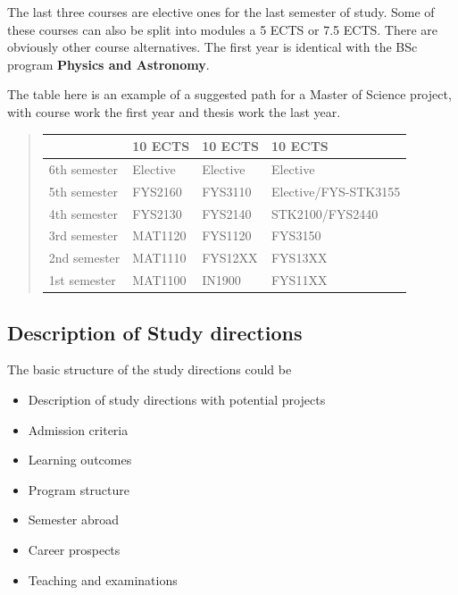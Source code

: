 \documentclass[%
oneside,                 %
final,                   %
10pt]{article}
\begin{document}
\noindent
The last three courses are elective ones for the last semester of
study. Some of these courses can also be split into modules a 5 ECTS
or 7.5 ECTS.  There are obviously other course alternatives.  The
first year is identical with the BSc program \textbf{Physics and Astronomy}.

The table here is an example of a suggested path for a Master of Science project,
with course work the first year and thesis work the last year.


\begin{quote}
\begin{tabular}{llll}
\hline
\multicolumn{1}{l}{  } & \multicolumn{1}{l}{ 10 ECTS } & \multicolumn{1}{l}{ 10 ECTS } & \multicolumn{1}{l}{ 10 ECTS } \\
\hline
6th semester & Elective & Elective & Elective             \\
\hline
5th semester & FYS2160  & FYS3110  & Elective/FYS-STK3155 \\
\hline
4th semester & FYS2130  & FYS2140  & STK2100/FYS2440      \\
\hline
3rd semester & MAT1120  & FYS1120  & FYS3150              \\
\hline
2nd semester & MAT1110  & FYS12XX  & FYS13XX              \\
\hline
1st semester & MAT1100  & IN1900   & FYS11XX              \\
\hline
\end{tabular}
\end{quote}

\noindent
\subsection{Description of Study directions}

The basic structure of the study directions could be

\begin{itemize}
\item Description of study directions with potential projects

\item Admission criteria

\item Learning outcomes

\item Program structure

\item Semester abroad

\item Career prospects

\item Teaching and examinations
\end{itemize}
\end{document}
